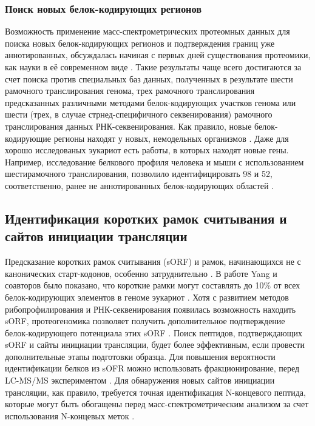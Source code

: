 \subsubsection{Поиск новых белок-кодирующих регионов}
Возможность применение масс-спектрометрических протеомных данных для поиска новых белок-кодирующих регионов и подтверждения границ уже аннотированных, обсуждалась начиная с первых дней существования протеомики, как науки в её современном виде \cite{choudhary2001interrogating, andersen2001mass}. Такие результаты чаще всего достигаются за счет поиска против специальных баз данных, полученных в результате шести рамочного транслирования генома, трех рамочного транслирования предсказанных различными методами белок-кодирующих участков генома или шести (трех, в случае стрнед-специфичного секвенирования) рамочного транслирования данных РНК-секвенирования. Как правило, новые белок-кодирующие регионы находят у новых, немодельных организмов \cite{castellana2014automated, castellana2008discovery, yang2011discovery}. Даже для хорошо исследованых эукариот есть работы, в которых находят новые гены. Например, исследование белкового профиля человека и мыши с использованием шестирамочного транслирования, позволило идентифицировать 98 и 52, соответственно, ранее не аннотированных белок-кодирующих областей \cite{branca2014hirief}.

\subsection{Идентификация коротких рамок считывания и сайтов инициации трансляции}
Предсказание коротких рамок считывания (sORF) и рамок, начинающихся не с канонических старт-кодонов, особенно затруднительно \cite{yang2011discovery}. В работе Yang и соавторов было показано, что короткие рамки могут составлять до 10\% от всех белок-кодирующих элементов в геноме эукариот \cite{yang2011discovery}. Хотя с развитием методов рибопрофилирования и РНК-секвенирования появилась возможность находить sORF, протеогеномика позволяет получить дополнительное подтверждение белок-кодирующего потенциала этих sORF \cite{menschaert2013deep, oyama2007diversity, slavoff2013peptidomic}. Поиск пептидов, подтверждающих sORF и сайты инициации трансляции, будет более эффективным, если провести дополнительные этапы подготовки образца. Для повышения вероятности идентификации белков из sOFR можно использовать фракционирование, перед LC-MS/MS экспериментом \cite{slavoff2013peptidomic}. Для обнаружения новых сайтов инициации трансляции, как правило, требуется точная идентификация N-концевого пептида, которые могут быть обогащены перед масс-спектрометрическим анализом за счет использования N-концевых меток \cite{hartmann2014n}. 


